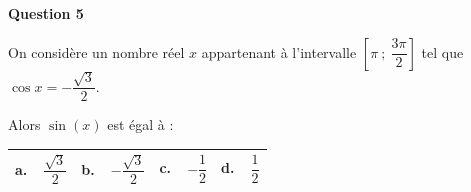 \documentclass[10pt]{article}
\begin{document}
\medskip

\textbf{Question 5}

\medskip

On considère un nombre réel $x$ appartenant à l'intervalle $\left[\pi~;~\dfrac{3\pi}{2}\right]$ tel que $\cos x = - \dfrac{\sqrt{3}}{2}$.

Alors $\sin (x)$ est égal à :

\begin{center}
\begin{tabularx}{\linewidth}{|*{4}{X|}}\hline
\textbf{a.~~}$\dfrac{\sqrt{3}}{2}$ &\textbf{b.~~}$-\dfrac{\sqrt{3}}{2}$&\textbf{c.~~}$-\dfrac{1}{2}$&\textbf{d.~~}$\dfrac{1}{2}$\rule[-3mm]{0mm}{9mm}\\ \hline
\end{tabularx}
\end{center}

\bigskip
\end{document}
